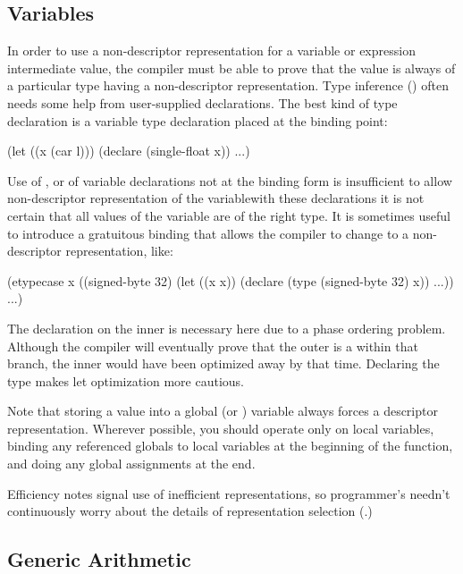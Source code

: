 \subsection{Variables}
\label{ND-variables}

In order to use a non-descriptor representation for a variable or
expression intermediate value, the compiler must be able to prove that
the value is always of a particular type having a non-descriptor
representation.  Type inference () often needs
some help from user-supplied declarations.  The best kind of type
declaration is a variable type declaration placed at the binding
point:
\begin{lisp}
(let ((x (car l)))
  (declare (single-float x))
  ...)
\end{lisp}
Use of , or of variable declarations not at the binding form
is insufficient to allow non-descriptor representation of the
variable\dash{}with these declarations it is not certain that all
values of the variable are of the right type.  It is sometimes useful
to introduce a gratuitous binding that allows the compiler to change
to a non-descriptor representation, like:
\begin{lisp}
(etypecase x
  ((signed-byte 32)
   (let ((x x))
     (declare (type (signed-byte 32) x)) 
     ...))
  ...)
\end{lisp}
The declaration on the inner  is necessary here due to a phase
ordering problem.  Although the compiler will eventually prove that
the outer  is a  within that
 branch, the inner  would have been optimized
away by that time.  Declaring the type makes let optimization more
cautious.

Note that storing a value into a global (or ) variable
always forces a descriptor representation.  Wherever possible, you
should operate only on local variables, binding any referenced globals
to local variables at the beginning of the function, and doing any
global assignments at the end.

Efficiency notes signal use of inefficient representations, so
programmer's needn't continuously worry about the details of
representation selection (.)


\subsection{Generic Arithmetic}
\label{generic-arithmetic}

